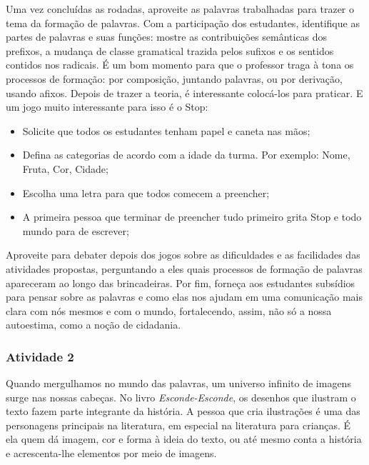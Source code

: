 \documentclass[11pt]{extarticle}
\begin{document}
Uma vez concluídas as rodadas, aproveite as palavras trabalhadas para trazer o tema da formação de palavras. Com a participação dos estudantes, identifique as partes de palavras e suas funções: mostre as contribuições semânticas dos prefixos, a mudança de classe gramatical trazida pelos sufixos e os sentidos contidos nos radicais. É um bom momento para que o professor traga à tona os processos de formação: por composição, juntando palavras, ou por derivação, usando afixos. Depois de trazer a teoria, é interessante colocá-los para praticar. E um jogo muito interessante para isso é o Stop:

\begin{itemize}
\item Solicite que todos os estudantes tenham papel e caneta nas mãos;
\item Defina as categorias de acordo com a idade da turma. Por exemplo: Nome, Fruta, Cor, Cidade;
\item Escolha uma letra para que todos comecem a preencher;
\item A primeira pessoa que terminar de preencher tudo primeiro grita Stop e todo mundo para de escrever;
\end{itemize}

Aproveite para debater depois dos jogos sobre as dificuldades e as facilidades das atividades propostas, perguntando a eles quais processos de formação de palavras apareceram ao longo das brincadeiras. Por fim, forneça aos estudantes subsídios para pensar sobre as palavras e como elas nos ajudam em uma comunicação mais clara com nós mesmos e com o mundo, fortalecendo, assim, não só a nossa autoestima, como a noção de cidadania.

\subsubsection{Atividade 2}


Quando mergulhamos no mundo das palavras, um universo infinito de imagens surge nas nossas cabeças. No livro \textit{Esconde-Esconde}, os desenhos que ilustram o texto fazem parte integrante da história. A pessoa que cria ilustrações é uma das personagens principais na literatura, em especial na literatura para crianças. É ela quem dá imagem, cor e forma à ideia do texto, ou até mesmo conta a história e acrescenta-lhe elementos por meio de imagens. 
\end{document}
